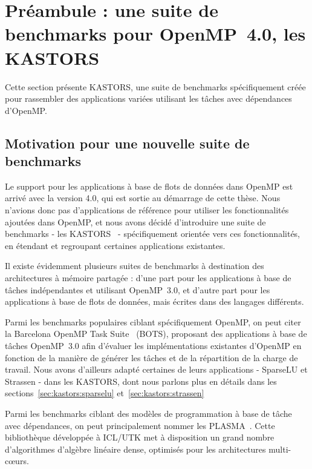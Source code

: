 \section{Préambule : une suite de benchmarks pour OpenMP~4.0, les KASTORS}\label{sec:openmp:kastors}

Cette section présente KASTORS, une suite de benchmarks spécifiquement créée pour rassembler des applications variées utilisant les tâches avec dépendances d'OpenMP.

\subsection{Motivation pour une nouvelle suite de benchmarks}

Le support pour les applications à base de flots de données dans OpenMP est arrivé avec la version 4.0, qui est sortie au démarrage de cette thèse.
Nous n'avions donc pas d'applications de référence pour utiliser les fonctionnalités ajoutées dans OpenMP, et nous avons décidé d'introduire une suite de benchmarks - les KASTORS~\cite{Virouleau2014} - spécifiquement orientée vers ces fonctionnalités, en étendant et regroupant certaines applications existantes.

Il existe évidemment plusieurs suites de benchmarks à destination des architectures à mémoire partagée : d'une part pour les applications à base de tâches indépendantes et utilisant OpenMP~3.0, et d'autre part pour les applications à base de flots de données, mais écrites dans des langages différents.

Parmi les benchmarks populaires ciblant spécifiquement OpenMP, on peut citer la Barcelona OpenMP Task Suite~\cite{Duran2009} (BOTS), proposant des applications à base de tâches OpenMP~3.0 afin d'évaluer les implémentations existantes d'OpenMP en fonction de la manière de générer les tâches et de la répartition de la charge de travail.
Nous avons d'ailleurs adapté certaines de leurs applications - SparseLU et Strassen - dans les KASTORS, dont nous parlons plus en détails dans les sections~\ref{sec:kastors:sparselu} et~\ref{sec:kastors:strassen}

Parmi les benchmarks ciblant des modèles de programmation à base de tâche avec dépendances, on peut principalement nommer les PLASMA~\cite{Kurzak2013}.
Cette bibliothèque développée à ICL/UTK met à disposition un grand nombre d'algorithmes d'algèbre linéaire dense, optimisés pour les architectures multi-cœurs.

